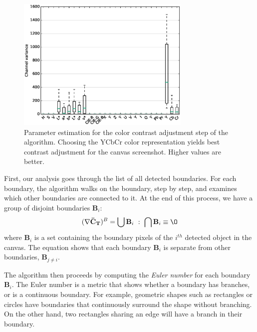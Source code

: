 \begin{figure}[t]
    \centering
    \includegraphics[trim={0.3cm 0.3cm 0.3cm 0.3cm},clip,height=0.35\textheight, width=0.74\textwidth]{testability/figures/colorspace-parameter.eps}
    \caption{Parameter estimation for the color contrast adjustment step of the algorithm. Choosing the YCbCr color representation yields best contrast adjustment for the canvas screenshot. Higher values are better. }
    \label{fig:param-est-colorspace}
\end{figure}



First, our analysis goes through the list of all detected boundaries. For each boundary, the algorithm walks on the boundary, step by step, and examines which other boundaries are connected to it. At the end of this process, we have a group of disjoint boundaries $\mathbf{B}_i$:
\begin{equation}
\label{eqn:approach-regions}
(\nabla \mathbf{\bar{C}_T})^B = \bigcup \mathbf{B}_i \,\, : \,\, \bigcap \mathbf{B}_i \equiv \O
\end{equation}
where $\mathbf{B}_i$ is a set containing the boundary pixels of the $i^{th}$ detected object in the canvas. The equation shows that each boundary $\mathbf{B}_i$ is separate from other boundaries, $\mathbf{B}_{j\neq i}$.

The algorithm then proceeds by computing the \emph{Euler number} \cite{sossa1996computation} for each boundary $\mathbf{B}_i$. The Euler number is a metric that shows whether a boundary has branches, or is a continuous boundary. For example, geometric shapes such as rectangles or circles have boundaries that continuously surround the shape without branching. On the other hand, two rectangles sharing an edge will have a branch in their boundary.

